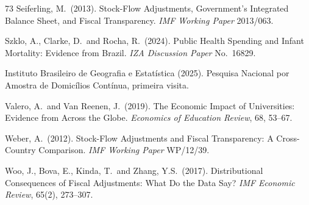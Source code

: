 \documentclass[11pt,a4paper]{article}
\begin{document}
\begin{thebibliography}{73}
 Seiferling, M.\ (2013). Stock-Flow Adjustments, Government's Integrated Balance Sheet, and Fiscal Transparency. \textit{IMF Working Paper} 2013/063.

 Szklo, A., Clarke, D.\ and Rocha, R.\ (2024). Public Health Spending and Infant Mortality: Evidence from Brazil. \textit{IZA Discussion Paper} No.\ 16829.

 Instituto Brasileiro de Geografia e Estat\'istica (2025). Pesquisa Nacional por Amostra de Domic\'ilios Cont\'inua, primeira visita.

 Valero, A.\ and Van Reenen, J.\ (2019). The Economic Impact of Universities: Evidence from Across the Globe. \textit{Economics of Education Review}, 68, 53--67.

 Weber, A.\ (2012). Stock-Flow Adjustments and Fiscal Transparency: A Cross-Country Comparison. \textit{IMF Working Paper} WP/12/39.

 Woo, J., Bova, E., Kinda, T.\ and Zhang, Y.S.\ (2017). Distributional Consequences of Fiscal Adjustments: What Do the Data Say? \textit{IMF Economic Review}, 65(2), 273--307.

\end{thebibliography}
\end{document}
